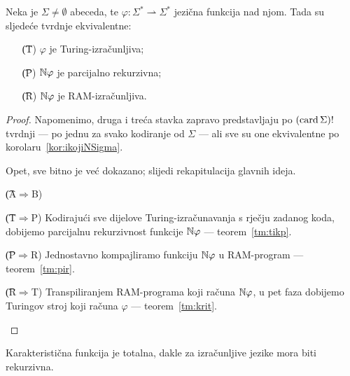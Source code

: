 \begin{teorem}
Neka je $\Sigma\not=\emptyset$ abeceda, te $\varphi\colon\Sigma^*\rightharpoonup\Sigma^*$ jezična funkcija nad njom. Tada su sljedeće tvrdnje ekvivalentne:
\begin{itemize}
    \item[\t{(T)}] $\varphi$ je Turing-izračunljiva;
    \item[\t{(P)}] ${\mathbb N}\varphi$ je parcijalno rekurzivna;
    \item[\t{(R)}] ${\mathbb N}\varphi$ je RAM-izračunljiva.
\end{itemize}
\end{teorem}
\begin{proof}
Napomenimo, druga i treća stavka zapravo predstavljaju po $(\operatorname{card}\Sigma)!$ tvrdnji --- po jednu za svako kodiranje od $\Sigma$ --- ali sve su one ekvivalentne po korolaru~\ref{kor:ikojiNSigma}.

Opet, sve bitno je već dokazano; slijedi rekapitulacija glavnih ideja.
\begin{labeling}{\t{(A$\Rightarrow$B)}}
\item[\t{(T$\Rightarrow$P)}] Kodirajući sve dijelove Turing-izračunavanja s rječju zadanog koda, dobijemo parcijalnu rekurzivnost funkcije ${\mathbb N}\varphi$ --- teorem~\ref{tm:tikp}.
\item[\t{(P$\Rightarrow$R)}] Jednostavno kompajliramo funkciju ${\mathbb N}\varphi$ u RAM-program --- teorem~\ref{tm:pir}.
\item[\t{(R$\Rightarrow$T)}] Transpiliranjem RAM-programa koji računa ${\mathbb N}\varphi$, u pet faza dobijemo Turingov stroj koji računa $\varphi$ --- teorem~\ref{tm:krit}.\qedhere
\end{labeling}
\end{proof}

Karakteristična funkcija je totalna, dakle za izračunljive jezike mora biti rekurzivna.

